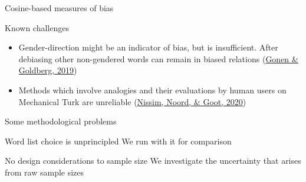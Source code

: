 \documentclass[
  10pt,
  ignorenonframetext,
  x11names, dvipsnames, bibspacing,natbib]{beamer}
\begin{document}
\begin{frame}{Cosine-based measures of bias}
\protect\hypertarget{cosine-based-measures-of-bias-7}{}
\begin{block}{Known challenges}
\protect\hypertarget{known-challenges}{}
\begin{itemize}
\item
  Gender-direction might be an indicator of bias, but is insufficient.
  After debiasing other non-gendered words can remain in biased
  relations (\protect\hyperlink{ref-Gonen2019lipstick}{Gonen \&
  Goldberg, 2019})
\item
  Methods which involve analogies and their evaluations by human users
  on Mechanical Turk are unreliable
  (\protect\hyperlink{ref-Nissim2020fair}{Nissim, Noord, \& Goot, 2020})
\end{itemize}
\end{block}
\end{frame}

\begin{frame}{Some methodological problems}
\protect\hypertarget{some-methodological-problems}{}
\begin{block}{Word list choice is unprincipled}
\protect\hypertarget{word-list-choice-is-unprincipled}{}
We run with it for comparison

\pause
\end{block}

\begin{block}{No design considerations to sample size}
\protect\hypertarget{no-design-considerations-to-sample-size}{}
We investigate the uncertainty that arises from raw sample sizes
\end{block}
\end{frame}
\end{document}
